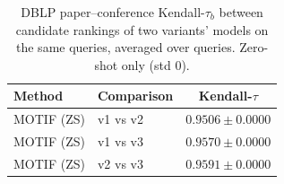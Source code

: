 \begin{table}[t]
\centering
\small
\begin{tabular}{||l||l||c||}
\hline
\textbf{Method} & \textbf{Comparison} & \textbf{Kendall-$\tau$} \\
\hline\hline
MOTIF (ZS) & v1 vs v2 & $0.9506 \pm 0.0000$ \\
\hline
MOTIF (ZS) & v1 vs v3 & $0.9570 \pm 0.0000$ \\
\hline
MOTIF (ZS) & v2 vs v3 & $0.9591 \pm 0.0000$ \\
\hline
\end{tabular}
\caption{DBLP paper--conference Kendall-$\tau_b$ between candidate rankings of two variants' models on the same queries, averaged over queries. Zero-shot only (std 0). }
\label{tab:dblp_paper_conference_seed_invariance}
\end{table}
